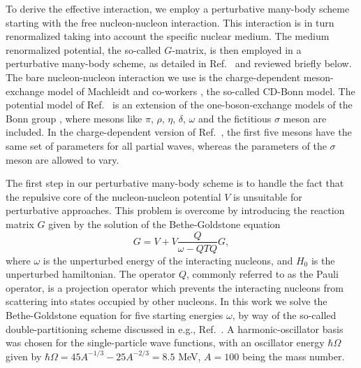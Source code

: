 \begin{multicols}{2}
To derive the effective interaction, we employ 
a  perturbative many-body scheme starting with the free nucleon-nucleon
interaction. This interaction is in turn renormalized
taking into account the specific nuclear medium. The medium
renormalized potential, the so-called $G$-matrix, is then
employed in a perturbative many-body scheme, as detailed in
Ref.\ \cite{hko95} and reviewed briefly below. 
The bare nucleon-nucleon interaction we use is the charge-dependent
meson-exchange model of Machleidt and co-workers \cite{cdbonn}, the so-called
CD-Bonn model.
The potential model of Ref.\ \cite{cdbonn} is an extension of the 
one-boson-exchange models of the Bonn group \cite{mac89}, where mesons 
like $\pi$, $\rho$, $\eta$, $\delta$, $\omega$ and the fictitious
$\sigma$ meson are included. In the charge-dependent version
of Ref.\ \cite{cdbonn}, the first five mesons have the same set
of parameters for all partial waves, whereas the parameters of
the $\sigma$ meson are allowed to vary. 

The first step 
in our perturbative many-body scheme is to handle 
the fact that the repulsive core of the nucleon-nucleon potential $V$
is unsuitable for perturbative approaches. This problem is overcome
by introducing the reaction matrix $G$ given by the solution of the
Bethe-Goldstone equation
\begin{equation}
    G=V+V\frac{Q}{\omega - QTQ}G,
\end{equation}
where $\omega$ is the unperturbed energy of the interacting nucleons,
and $H_0$ is the unperturbed hamiltonian. 
The operator $Q$, commonly referred to
as the Pauli operator, is a projection operator which prevents the
interacting nucleons from scattering into states occupied by other nucleons.
In this work we solve the Bethe-Goldstone equation for five starting
energies $\omega$, by way of the so-called double-partitioning scheme
discussed in e.g.,  Ref.\ \cite{hko95}. 
A harmonic-oscillator basis was chosen for the
single-particle
wave functions, with an oscillator energy $\hbar\Omega$ given
by
$\hbar\Omega = 45A^{-1/3} - 25A^{-2/3}=8.5 $ MeV,  $A=100$ being the mass
number.


\end{multicols}
